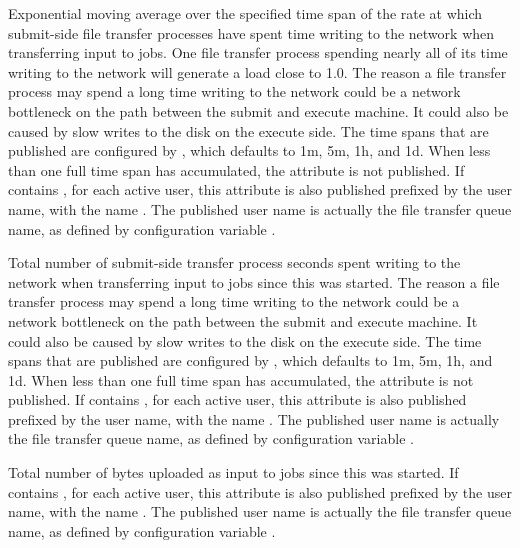 \begin{description}
\item[\AdAttr{FileTransferNetWriteLoad\_<timespan>}] Exponential
  moving average over the specified time span of the rate at which
  submit-side file transfer processes have spent time writing to the
  network when transferring input to jobs.  One file transfer process
  spending nearly all of its time writing to the network will generate
  a load close to 1.0.  The reason a file transfer process may spend
  a long time writing to the network could be a network bottleneck on
  the path between the submit and execute machine.  It could also be
  caused by slow writes to the disk on the execute side.
  The time spans that are published are configured by
  , which defaults to
  1m, 5m, 1h, and 1d.  When less than one full time span has
  accumulated, the attribute is not published.
  If  contains ,
  for each active user, this attribute is also published prefixed by
  the user name, with the name
  .
  The published user name is actually the file transfer queue name, as
  defined by configuration variable .

\item[\AdAttr{FileTransferNetWriteSeconds}] Total number of
  submit-side transfer process seconds spent writing to the network
  when transferring input to jobs since this  was
  started.  The reason a file transfer process may spend
  a long time writing to the network could be a network bottleneck on
  the path between the submit and execute machine.  It could also be
  caused by slow writes to the disk on the execute side.
  The time spans that are published are configured by
  , which defaults to
  1m, 5m, 1h, and 1d.  When less than one full time span has
  accumulated, the attribute is not published.
  If  contains ,
  for each active user, this attribute is also published prefixed by
  the user name, with the name
  .
  The published user name is actually the file transfer queue name, as
  defined by configuration variable .

\item[\AdAttr{FileTransferUploadBytes}] Total number of bytes uploaded
  as input to jobs since this  was started.
  If  contains ,
  for each active user, this attribute is also published prefixed by
  the user name, with the name
  .
  The published user name is actually the file transfer queue name, as
  defined by configuration variable .


\end{description}
